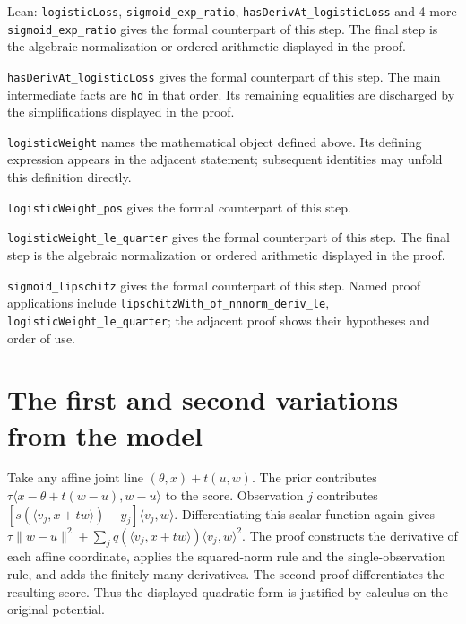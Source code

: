 \documentclass[11pt,a4paper]{article}
\begin{document}
\begin{leanbox}{Lean: \texttt{logisticLoss}, \texttt{sigmoid\_\allowbreak{}exp\_\allowbreak{}ratio}, \texttt{hasDerivAt\_\allowbreak{}logisticLoss} and 4 more}
\texttt{sigmoid\_\allowbreak{}exp\_\allowbreak{}ratio} gives the formal counterpart of this step. The final step is the algebraic normalization or ordered arithmetic displayed in the proof.




\texttt{has\allowbreak{}Deriv\allowbreak{}At\_\allowbreak{}logistic\allowbreak{}Loss} gives the formal counterpart of this step. The main intermediate facts are \texttt{hd} in that order. Its remaining equalities are discharged by the simplifications displayed in the proof.




\texttt{logistic\allowbreak{}Weight} names the mathematical object defined above. Its defining expression appears in the adjacent statement; subsequent identities may unfold this definition directly.




\texttt{logistic\allowbreak{}Weight\_\allowbreak{}pos} gives the formal counterpart of this step.




\texttt{logistic\allowbreak{}Weight\_\allowbreak{}le\_\allowbreak{}quarter} gives the formal counterpart of this step. The final step is the algebraic normalization or ordered arithmetic displayed in the proof.




\texttt{sigmoid\_\allowbreak{}lipschitz} gives the formal counterpart of this step. Named proof applications include \texttt{lipschitz\allowbreak{}With\_\allowbreak{}of\_\allowbreak{}nnnorm\_\allowbreak{}deriv\_\allowbreak{}le}, \texttt{logistic\allowbreak{}Weight\_\allowbreak{}le\_\allowbreak{}quarter}; the adjacent proof shows their hypotheses and order of use.
\end{leanbox}

\section{\texorpdfstring{The first and second variations from the model}{The first and second variations from the model}}


Take any affine joint line \((\theta,x)+t(u,w)\). The prior contributes \(\tau\langle x-\theta+t(w-u),w-u\rangle\) to the score. Observation \(j\) contributes \([s(\langle v_j,x+tw\rangle)-y_j]\langle v_j,w\rangle\). Differentiating this scalar function again gives \(\tau\|w-u\|^2+\sum_jq(\langle v_j,x+tw\rangle)\langle v_j,w\rangle^2\). The proof constructs the derivative of each affine coordinate, applies the squared-norm rule and the single-observation rule, and adds the finitely many derivatives. The second proof differentiates the resulting score. Thus the displayed quadratic form is justified by calculus on the original potential.
\end{document}
